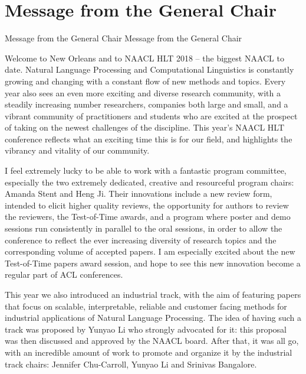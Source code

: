 \vspace{2em}

\section{Message from the General Chair}\vspace{2em}
\setheaders%
    {Message from the General Chair}%
    {Message from the General Chair}
\thispagestyle{emptyheader}


Welcome to New Orleans and to NAACL HLT 2018 – the biggest NAACL to
date.  Natural Language Processing and Computational Linguistics is
constantly growing and changing with a constant flow of new methods
and topics. Every year also sees an even more exciting and diverse
research community, with a steadily increasing number researchers,
companies both large and small, and a vibrant community of
practitioners and students who are excited at the prospect of taking
on the newest challenges of the discipline.  This year’s NAACL HLT
conference reflects what an exciting time this is for our field, and
highlights the vibrancy and vitality of our community.

I feel extremely lucky to be able to work with a fantastic program
committee, especially the two extremely dedicated, creative and
resourceful program chairs: Amanda Stent and Heng Ji. Their
innovations include a new review form, intended to elicit higher
quality reviews, the opportunity for authors to review the reviewers,
the Test-of-Time awards, and a program where poster and demo sessions
run consistently in parallel to the oral sessions, in order to allow
the conference to reflect the ever increasing diversity of research
topics and the corresponding volume of accepted papers.  I am
especially excited about the new Test-of-Time papers award session,
and hope to see this new innovation become a regular part of ACL
conferences.

This year we also introduced an industrial track, with the aim of
featuring papers that focus on scalable, interpretable, reliable and
customer facing methods for industrial applications of Natural
Language Processing. The idea of having such a track was proposed by
Yunyao Li who strongly advocated for it: this proposal was then
discussed and approved by the NAACL board. After that, it was all go,
with an incredible amount of work to promote and organize it by the
industrial track chairs: Jennifer Chu-Carroll, Yunyao Li and Srinivas
Bangalore.

